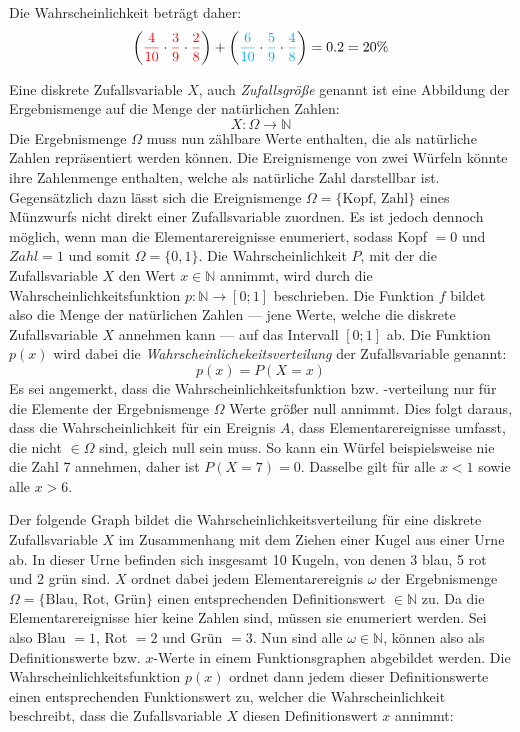 \vspace{\parskip}

Die Wahrscheinlichkeit betr\"{a}gt daher: $$\left({\color{red} \frac{4}{10}} \cdot {\color{red} \frac{3}{9}} \cdot {\color{red} \frac{2}{8}}\right) + \left({\color{cyan} \frac{6}{10}} \cdot {\color{cyan}\frac{5}{9}} \cdot {\color{cyan}\frac{4}{8}}\right) = 0.2 = 20 \%$$


Eine diskrete Zufallsvariable $X$, auch \emph{Zufallsgr\"{o}\ss{}e} genannt ist eine Abbildung der Ergebnismenge auf die Menge der nat\"{u}rlichen Zahlen: $$X: \Omega \rightarrow \mathbb{N}$$ Die Ergebnismenge $\Omega$ muss nun z\"{a}hlbare Werte enthalten, die als nat\"{u}rliche Zahlen repr\"{a}sentiert werden k\"{o}nnen. Die Ereignismenge von zwei W\"{u}rfeln k\"{o}nnte ihre Zahlenmenge enthalten, welche als nat\"{u}rliche Zahl darstellbar ist. Gegens\"{a}tzlich dazu l\"{a}sst sich die Ereignismenge $\Omega = \{ \text{Kopf, Zahl} \}$ eines M\"{u}nzwurfs nicht direkt einer Zufallsvariable zuordnen. Es ist jedoch dennoch m\"{o}glich, wenn man die Elementarereignisse enumeriert, sodass Kopf $= 0$ und $Zahl = 1$ und somit $\Omega = \{0 , 1\}$. Die Wahrscheinlichkeit $P$, mit der die Zufallsvariable $X$ den Wert $x \in \mathbb{N}$ annimmt, wird durch die Wahrscheinlichkeitsfunktion $p: \mathbb{N} \rightarrow [0 ; 1]$ beschrieben. Die Funktion $f$ bildet also die Menge der nat\"{u}rlichen Zahlen --- jene Werte, welche die diskrete Zufallsvariable $X$ annehmen kann --- auf das Intervall $[0 ; 1]$ ab. Die Funktion $p(x)$ wird dabei die \emph{Wahrscheinlichekeitsverteilung} der Zufallsvariable genannt: $$p(x) = P(X = x)$$ Es sei angemerkt, dass die Wahrscheinlichkeitsfunktion bzw. -verteilung nur f\"{u}r die Elemente der Ergebnismenge $\Omega$ Werte gr\"{o}\ss{}er null annimmt. Dies folgt daraus, dass die Wahrscheinlichkeit f\"{u}r ein Ereignis $A$, dass Elementarereignisse umfasst, die nicht $\in \Omega$ sind, gleich null sein muss. So kann ein W\"{u}rfel beispielsweise nie die Zahl 7 annehmen, daher ist $P(X = 7) = 0$. Dasselbe gilt f\"{u}r alle $x < 1$ sowie alle $x > 6$.

\pagebreak

Der folgende Graph bildet die Wahrscheinlichkeitsverteilung f\"{u}r eine diskrete Zufallsvariable $X$ im Zusammenhang mit dem Ziehen einer Kugel aus einer Urne ab. In dieser Urne befinden sich insgesamt 10 Kugeln, von denen 3 blau, 5 rot und 2 gr\"{u}n sind. $X$ ordnet dabei jedem Elementarereignis $\omega$ der Ergebnismenge $\Omega = \{\text{Blau, Rot, Gr\"{u}n}\}$ einen entsprechenden Definitionswert $\in \mathbb{N}$ zu. Da die Elementarereignisse hier keine Zahlen sind, m\"{u}ssen sie enumeriert werden. Sei also Blau $= 1$, Rot $= 2$ und Gr\"{u}n $= 3$. Nun sind alle $\omega \in \mathbb{N}$, k\"{o}nnen also als Definitionswerte bzw. $x$-Werte in einem Funktionsgraphen abgebildet werden. Die Wahrscheinlichkeitsfunktion $p(x)$ ordnet dann jedem dieser Definitionswerte einen entsprechenden Funktionswert zu, welcher die Wahrscheinlichkeit beschreibt, dass die Zufallsvariable $X$ diesen Definitionswert $x$ annimmt:


